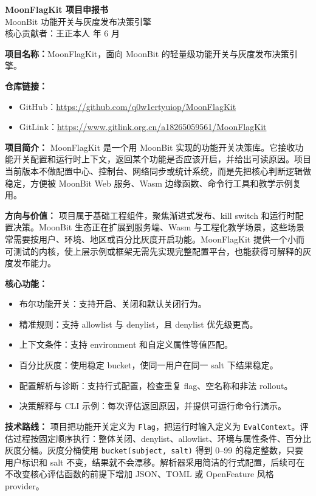 \documentclass[UTF8,a4paper,11pt]{ctexart}
\begin{document}
\begin{center}
{\LARGE\bfseries MoonFlagKit 项目申报书}\\[0.35em]
{\large MoonBit 功能开关与灰度发布决策引擎}\\[0.45em]
核心贡献者：王正本人  年 6 月
\end{center}

\textbf{项目名称：}MoonFlagKit，面向 MoonBit 的轻量级功能开关与灰度发布决策引擎。

\textbf{仓库链接：}
\begin{itemize}
  \item GitHub：{\small\url{https://github.com/q0w1ertyuiop/MoonFlagKit}}
  \item GitLink：{\small\url{https://www.gitlink.org.cn/a18265059561/MoonFlagKit}}
\end{itemize}

\textbf{项目简介：}
MoonFlagKit 是一个用 MoonBit 实现的功能开关决策库。它接收功能开关配置和运行时上下文，返回某个功能是否应该开启，并给出可读原因。项目当前版本不做配置中心、控制台、网络同步或统计系统，而是先把核心判断逻辑做稳定，方便被 MoonBit Web 服务、Wasm 边缘函数、命令行工具和教学示例复用。

\textbf{方向与价值：}
项目属于基础工程组件，聚焦渐进式发布、kill switch 和运行时配置决策。MoonBit 生态正在扩展到服务端、Wasm 与工程化教学场景，这些场景常需要按用户、环境、地区或百分比灰度开启功能。MoonFlagKit 提供一个小而可测试的内核，使上层示例或框架无需先实现完整配置平台，也能获得可解释的灰度发布能力。

\textbf{核心功能：}
\begin{itemize}
  \item 布尔功能开关：支持开启、关闭和默认关闭行为。
  \item 精准规则：支持 allowlist 与 denylist，且 denylist 优先级更高。
  \item 上下文条件：支持 environment 和自定义属性等值匹配。
  \item 百分比灰度：使用稳定 bucket，使同一用户在同一 salt 下结果稳定。
  \item 配置解析与诊断：支持行式配置，检查重复 flag、空名称和非法 rollout。
  \item 决策解释与 CLI 示例：每次评估返回原因，并提供可运行命令行演示。
\end{itemize}

\textbf{技术路线：}
项目把功能开关定义为 \texttt{Flag}，把运行时输入定义为 \texttt{EvalContext}。评估过程按固定顺序执行：整体关闭、denylist、allowlist、环境与属性条件、百分比灰度分桶。灰度分桶使用 \texttt{bucket(subject, salt)} 得到 0--99 的稳定整数，只要用户标识和 salt 不变，结果就不会漂移。解析器采用简洁的行式配置，后续可在不改变核心评估函数的前提下增加 JSON、TOML 或 OpenFeature 风格 provider。
\end{document}
